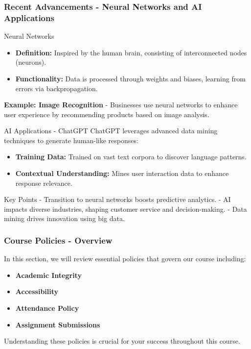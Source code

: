 \documentclass[aspectratio=169]{beamer}
\begin{document}
\begin{frame}[fragile]
    \frametitle{Recent Advancements - Neural Networks and AI Applications}
    
    \begin{block}{Neural Networks}
        \begin{itemize}
            \item \textbf{Definition:} Inspired by the human brain, consisting of interconnected nodes (neurons).
            \item \textbf{Functionality:} Data is processed through weights and biases, learning from errors via backpropagation.
        \end{itemize}
        
        \textbf{Example: Image Recognition}
        - Businesses use neural networks to enhance user experience by recommending products based on image analysis.
    \end{block}
    
    \begin{block}{AI Applications - ChatGPT}
        ChatGPT leverages advanced data mining techniques to generate human-like responses:
        
        \begin{itemize}
            \item \textbf{Training Data:} Trained on vast text corpora to discover language patterns.
            \item \textbf{Contextual Understanding:} Mines user interaction data to enhance response relevance.
        \end{itemize}
    \end{block}
    
    \begin{block}{Key Points}
        - Transition to neural networks boosts predictive analytics.
        - AI impacts diverse industries, shaping customer service and decision-making.
        - Data mining drives innovation using big data.
    \end{block}
\end{frame}

\begin{frame}[fragile]
    \frametitle{Course Policies - Overview}
    In this section, we will review essential policies that govern our course including:
    \begin{itemize}
        \item \textbf{Academic Integrity}
        \item \textbf{Accessibility}
        \item \textbf{Attendance Policy}
        \item \textbf{Assignment Submissions}
    \end{itemize}
    Understanding these policies is crucial for your success throughout this course.
\end{frame}
\end{document}
